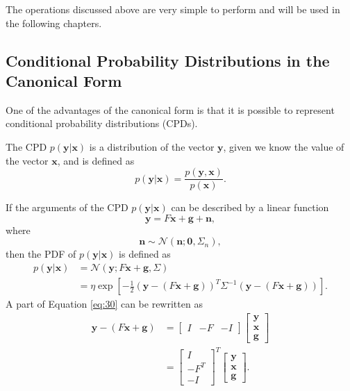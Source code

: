 \documentclass[12pt,oneside,openany,a4paper, %
afrikaans,english,
]{memoir}
\numberwithin{equation}{chapter}
\begin{document}
The operations discussed above are very simple to perform and will be used in the following chapters.
\subsection{Conditional Probability Distributions in the Canonical Form}
One of the advantages of the canonical form is that it is possible to represent conditional probability distributions (CPDs).

The CPD $p(\bm{y}|\bm{x})$ is a distribution of the vector $\bm{y}$, given we know the value of the vector $\bm{x}$, and is defined as
\begin{equation}
p(\bm{y}|\bm{x}) = \frac{p(\bm{y},\bm{x})}{p(\bm{x})}.
\end{equation}

If the arguments of the CPD $p(\bm{y}|\bm{x})$ can be described by a linear function
\begin{equation}
\bm{y} = F\bm{x} + \bm{g} + \bm{n},
\end{equation}
where
\begin{equation}
\bm{n} \sim \mathcal{N}(\bm{n}; \bm{0}, \Sigma_n),
\end{equation}
then the PDF of $p(\bm{y}|\bm{x})$ is defined as 
\begin{equation}
\label{eq:30}
\begin{split}
p(\bm{y}|\bm{x}) & = \mathcal{N}(\bm{y}; F\bm{x} + \bm{g}, \Sigma) \\
& = \eta\exp\left[-\frac{1}{2}(\bm{y} - (F\bm{x} + \bm{g}))^T\Sigma^{-1}(\bm{y}-(F\bm{x} + \bm{g}))\right].
\end{split}
\end{equation}
A part of Equation \ref{eq:30} can be rewritten as 
\begin{equation}\label{eq: rewrite}
\begin{split}
\bm{y} - (F\bm{x} + \bm{g}) & =
\begin{bmatrix}
I&-F&-I
\end{bmatrix}
\begin{bmatrix}
\bm{y}\\
\bm{x}\\
\bm{g}
\end{bmatrix}\\
& =
\begin{bmatrix}
I\\-F^T\\-I
\end{bmatrix}^T
\begin{bmatrix}
\bm{y}\\
\bm{x}\\
\bm{g}
\end{bmatrix}.
\end{split}
\end{equation}
\end{document}
